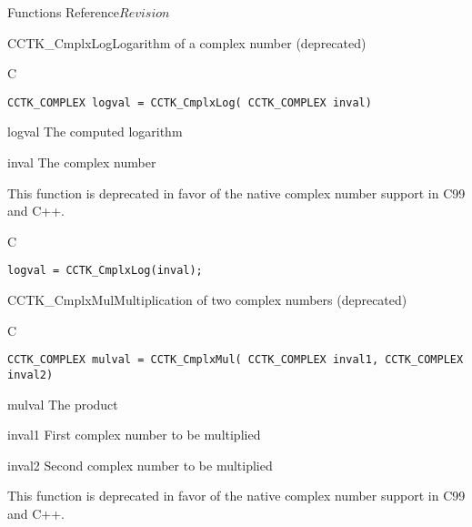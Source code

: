\begin{cactuspart}{ Functions Reference}{}{$Revision$}
\begin{FunctionDescription}{CCTK\_CmplxLog}{Logarithm of a complex number (deprecated)}
\label{CCTK-CmplxLog}
\begin{SynopsisSection}
\begin{Synopsis}{C}
\begin{verbatim}CCTK_COMPLEX logval = CCTK_CmplxLog( CCTK_COMPLEX inval)\end{verbatim}
\end{Synopsis}
\end{SynopsisSection}
\begin{ParameterSection}
\begin{Parameter}{logval}
The computed logarithm
\end{Parameter}
\begin{Parameter}{inval}
The complex number
\end{Parameter}
\end{ParameterSection}
\begin{Discussion}
This function is deprecated in favor of the native complex number support in
C99 and C++.
\end{Discussion}
\begin{ExampleSection}
\begin{Example}{C}
\begin{verbatim}
logval = CCTK_CmplxLog(inval);
\end{verbatim}
\end{Example}
\end{ExampleSection}
\end{FunctionDescription}

\begin{FunctionDescription}{CCTK\_CmplxMul}{Multiplication of two complex numbers (deprecated)}
\label{CCTK-CmplxMul}
\begin{SynopsisSection}
\begin{Synopsis}{C}
\begin{verbatim}CCTK_COMPLEX mulval = CCTK_CmplxMul( CCTK_COMPLEX inval1, CCTK_COMPLEX inval2)\end{verbatim}
\end{Synopsis}
\end{SynopsisSection}
\begin{ParameterSection}
\begin{Parameter}{mulval}
The product
\end{Parameter}
\begin{Parameter}{inval1}
First complex number to be multiplied
\end{Parameter}
\begin{Parameter}{inval2}
Second complex number to be multiplied
\end{Parameter}
\end{ParameterSection}
\begin{Discussion}
This function is deprecated in favor of the native complex number support in
C99 and C++.


\end{Discussion}
\end{FunctionDescription}
\end{cactuspart}
